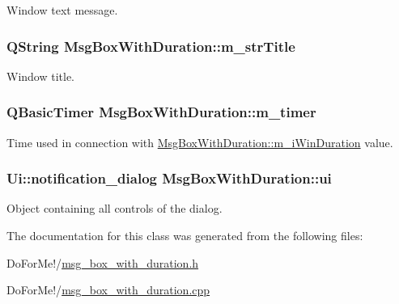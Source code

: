 Window text message. 

\hypertarget{class_msg_box_with_duration_ad98c5584c1e572b4dfd2ce93bda0869f}{
\subsubsection[{m\-\_\-str\-Title}]{\setlength{\rightskip}{0pt plus 5cm}Q\-String Msg\-Box\-With\-Duration\-::m\-\_\-str\-Title\hspace{0.3cm}{\ttfamily [private]}}}\label{class_msg_box_with_duration_ad98c5584c1e572b4dfd2ce93bda0869f}


Window title. 

\hypertarget{class_msg_box_with_duration_a37d6effb60594f9c1a3bd8d640203cf5}{
\subsubsection[{m\-\_\-timer}]{\setlength{\rightskip}{0pt plus 5cm}Q\-Basic\-Timer Msg\-Box\-With\-Duration\-::m\-\_\-timer\hspace{0.3cm}{\ttfamily [private]}}}\label{class_msg_box_with_duration_a37d6effb60594f9c1a3bd8d640203cf5}


Time used in connection with \hyperlink{class_msg_box_with_duration_afc0d11e89f2bd6e92b50d6ba54ffa8ae}{Msg\-Box\-With\-Duration\-::m\-\_\-i\-Win\-Duration} value. 

\hypertarget{class_msg_box_with_duration_af9d5df1430e9ad3390e7f353fc57f01d}{
\subsubsection[{ui}]{\setlength{\rightskip}{0pt plus 5cm}Ui\-::notification\-\_\-dialog Msg\-Box\-With\-Duration\-::ui\hspace{0.3cm}{\ttfamily [private]}}}\label{class_msg_box_with_duration_af9d5df1430e9ad3390e7f353fc57f01d}


Object containing all controls of the dialog. 



The documentation for this class was generated from the following files\-:\begin{DoxyCompactItemize}
\item 
Do\-For\-Me!/\hyperlink{msg__box__with__duration_8h}{msg\-\_\-box\-\_\-with\-\_\-duration.\-h}\item 
Do\-For\-Me!/\hyperlink{msg__box__with__duration_8cpp}{msg\-\_\-box\-\_\-with\-\_\-duration.\-cpp}\end{DoxyCompactItemize}
